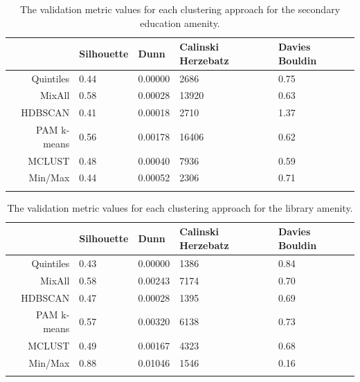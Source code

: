 \documentclass[11pt, a4paper]{article}
\begin{document}
\centering
\begin{longtable}[H]{|r|llll|}
  \hline
 & Silhouette & Dunn & Calinski Herzebatz & Davies Bouldin \\ 
  \hline
Quintiles & 0.44 & 0.00000 &  2686 & 0.75 \\ 
   \hline
MixAll & 0.58 & 0.00028 & 13920 & 0.63 \\ 
   \hline
HDBSCAN & 0.41 & 0.00018 &  2710 & 1.37 \\ 
   \hline
PAM k-means & 0.56 & 0.00178 & 16406 & 0.62 \\ 
   \hline
MCLUST & 0.48 & 0.00040 &  7936 & 0.59 \\ 
   \hline
Min/Max & 0.44 & 0.00052 &  2306 & 0.71 \\ 
   \hline
\caption[Secondary education validation metrics]{The validation metric values for each clustering approach for the secondary education amenity.}\label{seceducvalid}
\end{longtable}









\centering
\begin{longtable}[H]{|r|llll|}
 \hline
 & Silhouette & Dunn & Calinski Herzebatz & Davies Bouldin \\ 
  \hline
Quintiles & 0.43 & 0.00000 & 1386 & 0.84 \\ 
   \hline
MixAll & 0.58 & 0.00243 & 7174 & 0.70 \\ 
   \hline
HDBSCAN & 0.47 & 0.00028 & 1395 & 0.69 \\ 
   \hline
PAM k-means & 0.57 & 0.00320 & 6138 & 0.73 \\ 
   \hline
MCLUST & 0.49 & 0.00167 & 4323 & 0.68 \\ 
   \hline
Min/Max & 0.88 & 0.01046 & 1546 & 0.16 \\ 
   \hline
\caption[Library validation metrics]{The validation metric values for each clustering approach for the library amenity.}\label{libraryvalid}
\end{longtable}
\end{document}
